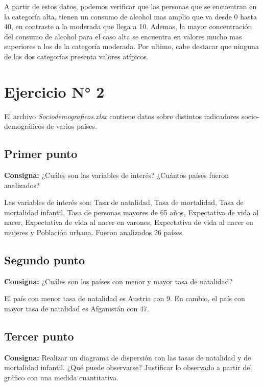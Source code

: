\documentclass{article} %
\begin{document}
A partir de estos datos, podemos verificar que las personas que se encuentran en la categoría alta, tienen un consumo de alcohol mas amplio que va desde 0 hasta 40, en contraste a la moderada que llega a 10. Ademas, la mayor concentración del consumo de alcohol para el caso alta se encuentra en valores mucho mas superiores a los de la categoría moderada. Por ultimo, cabe destacar que ninguna de las dos categorías presenta valores atípicos.


\section{Ejercicio N° 2}
El archivo \textit{Sociodemograficos.xlsx} contiene datos sobre distintos indicadores socio-demográficos de varios países.

\subsection{Primer punto}

\textbf{Consigna:} ¿Cuáles son las variables de interés? ¿Cuántos países fueron analizados?

Las variables de interés son: Tasa de natalidad, Tasa de mortalidad, Tasa de mortalidad infantil, Tasa de personas mayores de 65 años, Expectativa de vida al nacer, Expectativa de vida al nacer en varones, Expectativa de vida al nacer en mujeres y Población urbana. Fueron analizados 26 países.

\subsection{Segundo punto}

\textbf{Consigna:} ¿Cuáles son los países con menor y mayor tasa de natalidad?

El país con menor tasa de natalidad es Austria con 9. En cambio, el país con mayor tasa de natalidad es Afganistán con 47. 

\subsection{Tercer punto}

\textbf{Consigna:} Realizar un diagrama de dispersión con las tasas de natalidad y de mortalidad infantil. ¿Qué puede observarse? Justificar lo observado a partir del gráfico con una medida cuantitativa.
\end{document}
